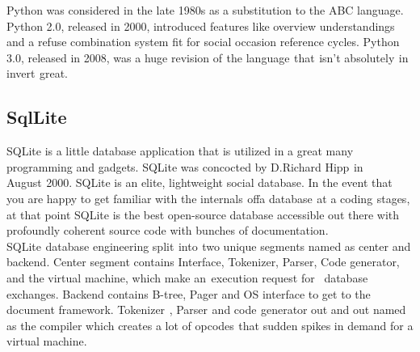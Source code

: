 \documentclass[oneside,12pt]{Classes/VTU}
\begin{document}
	Python was considered in the late 1980s as a substitution to the ABC language. Python 2.0, released in 2000, introduced features like overview understandings and a refuse combination system fit for social occasion reference cycles. Python 3.0, released in 2008, was a huge revision of\tiny\textcolor{white}{s}\normalsize the language\tiny\textcolor{white}{s}\normalsize that\tiny\textcolor{white}{s}\normalsize isn't absolutely\tiny\textcolor{white}{s}\normalsize in invert\tiny\textcolor{white}{s}\normalsize great.
	
	\subsection{SqlLite}
	SQLite is a little database application that is utilized in a great many programming and gadgets. SQLite was concocted by D.Richard Hipp\tiny\textcolor{white}{s}\normalsize in August\tiny\textcolor{white}{s}\normalsize 2000. SQLite is an elite, lightweight social database. In the event that you are happy to get familiar with the internals\tiny\textcolor{white}{s}\normalsize of\tiny\textcolor{white}{f}\normalsize a database\tiny\textcolor{white}{s}\normalsize at a coding\tiny\textcolor{white}{s}\normalsize stages, at that point SQLite is the best open-source database accessible out there with profoundly coherent source code with bunches of documentation. SQLite\tiny\textcolor{white}{s}\normalsize database engineering split\tiny\textcolor{white}{s}\normalsize into\tiny\textcolor{white}{s}\normalsize two unique segments named as center and backend. Center segment contains Interface, Tokenizer, Parser, Code generator, and the virtual machine, which make an\tiny\textcolor{white}{y}\normalsize execution request for\tiny\textcolor{white}{m}\normalsize database exchanges. Backend contains B-tree, Pager and OS interface to get to the document framework. Tokenizer\tiny\textcolor{white}{s}\normalsize , Parser\tiny\textcolor{white}{s}\normalsize and code\tiny\textcolor{white}{s}\normalsize generator\tiny\textcolor{white}{f}\normalsize out and out named as the compiler which creates a lot of opcodes\tiny\textcolor{white}{s}\normalsize that sudden spikes in demand for a virtual machine.
	
\end{document}
